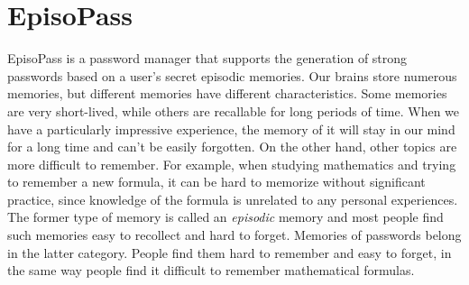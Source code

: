 \documentclass[runningheads,a4paper]{llncs}
\begin{document}
\section{EpisoPass}

EpisoPass is a password manager that supports the generation of
strong passwords based on a user's secret episodic memories.
%
%
Our brains store numerous memories, but different memories have
different characteristics.  Some memories are very short-lived, while
others are recallable for long periods of time.  When we have a
particularly impressive experience, the memory of it will stay in our
mind for a long time and can't be easily forgotten.  On the other
hand, other topics are more difficult to remember. For example, when
studying mathematics and trying to remember a new formula, it can be
hard to memorize without significant practice, since knowledge of the
formula is unrelated to any personal experiences.
The former type of memory is called an {\it episodic\/} memory and most people find such
memories easy to recollect and hard to forget.
Memories of passwords belong in the latter category. People find them
hard to remember and easy to forget, in the same way people find it difficult
 to remember mathematical formulas.

% 
\end{document}
